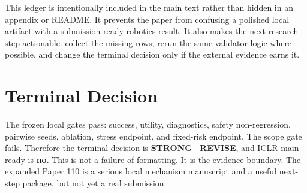 \documentclass{article}
\newcommand{\terminal}{\textbf{STRONG\_REVISE}}
\begin{document}
This ledger is intentionally included in the main text rather than hidden in an appendix or README. It prevents the paper from confusing a polished local artifact with a submission-ready robotics result. It also makes the next research step actionable: collect the missing rows, rerun the same validator logic where possible, and change the terminal decision only if the external evidence earns it.

\section{Terminal Decision}
The frozen local gates pass: success, utility, diagnostics, safety non-regression, pairwise seeds, ablation, stress endpoint, and fixed-risk endpoint. The scope gate fails. Therefore the terminal decision is \terminal, and ICLR main ready is \textbf{no}. This is not a failure of formatting. It is the evidence boundary. The expanded Paper 110 is a serious local mechanism manuscript and a useful next-step package, but not yet a real submission.

\begingroup
\raggedright


\endgroup
\end{document}
